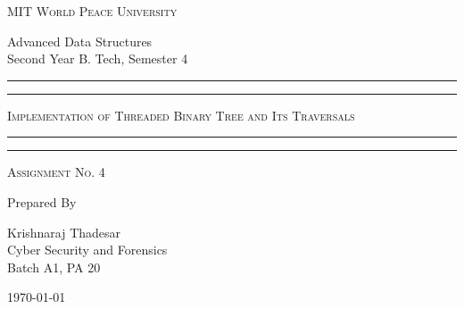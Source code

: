 \documentclass[11pt]{article}
\begin{document}
\begin{titlepage}
    \centering


    \huge\textsc{
        MIT World Peace University
    }\\

    \vspace{0.75\baselineskip} %

    \LARGE{
        Advanced Data Structures\\
        Second Year B. Tech, Semester 4
    }

    \vfill %


    \rule{\textwidth}{1.6pt}\vspace*{-\baselineskip}\vspace*{2pt}
    \rule{\textwidth}{0.6pt}
    \vspace{0.75\baselineskip} %



    \huge{\textsc{
            Implementation of Threaded Binary Tree and Its Traversals
        }} \\



    \vspace{0.5\baselineskip} %
    \rule{\textwidth}{0.6pt}\vspace*{-\baselineskip}\vspace*{2.8pt}
    \rule{\textwidth}{1.6pt}

    \vspace{1\baselineskip} %


    \LARGE\textsc{
        Assignment No. 4
    } %
    \vfill


    Prepared By
    \vspace{0.5\baselineskip} %

    \Large{
        Krishnaraj Thadesar \\
        Cyber Security and Forensics\\
        Batch A1, PA 20
    }


    \vspace{0.5\baselineskip} %
    \today

\end{titlepage}
\end{document}
